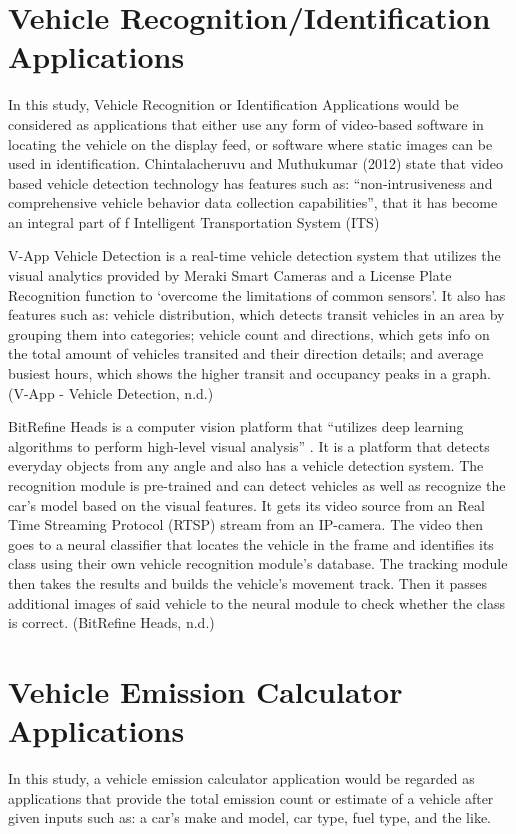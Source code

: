 \section{Vehicle Recognition/Identification Applications}
	
	In this study, Vehicle Recognition or Identification Applications would be considered as applications that either use any form of video-based software in locating the vehicle on the display feed, or software where static images can be used in identification. Chintalacheruvu and Muthukumar  (2012) state that video based vehicle detection technology has features such as: “non-intrusiveness and comprehensive vehicle behavior data collection capabilities”, that it has become an integral part of f Intelligent Transportation System (ITS)

	V-App Vehicle Detection is a real-time vehicle detection system that utilizes the visual analytics provided by Meraki Smart Cameras and a License Plate Recognition function to ‘overcome the limitations of common sensors’. It also has features such as: vehicle distribution, which detects transit vehicles in an area by grouping them into categories; vehicle count and directions, which gets info on the total amount of vehicles transited and their direction details; and average busiest hours, which shows the higher transit and occupancy peaks in a graph. (V-App - Vehicle Detection, n.d.)

	BitRefine Heads is a computer vision platform that “utilizes deep learning algorithms to perform high-level visual analysis” . It is a platform that detects everyday objects from any angle and also has a vehicle detection system. The recognition module is pre-trained and can detect vehicles as well as recognize the car’s model based on the visual features. It gets its video source from an Real Time Streaming Protocol (RTSP) stream from an IP-camera. The video then goes to a neural classifier that locates the vehicle in the frame and identifies its class using their own vehicle recognition module’s database.  The tracking module then takes the results and builds the vehicle’s movement track. Then it passes additional images of said vehicle to the neural module to check whether the class is correct. (BitRefine Heads, n.d.)


\section{Vehicle Emission Calculator Applications}
	In this study, a vehicle emission calculator application would be regarded as applications that provide the total emission count or estimate of a vehicle after given inputs such as: a car’s make and model, car type, fuel type, and the like.

